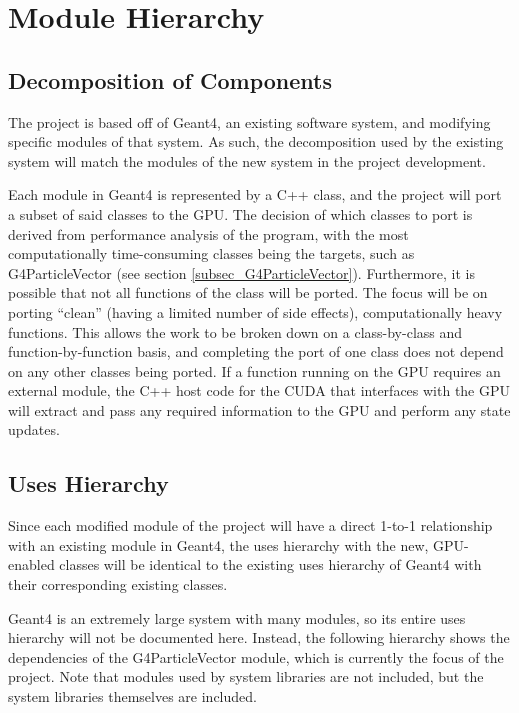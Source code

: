 \documentclass[12pt]{article}
\begin{document}
\section{Module Hierarchy}%
\subsection{Decomposition of Components}
The project is based off of Geant4, an existing software system, and modifying specific modules of that system. As such, the decomposition used by the existing system will match the modules of the new system in the project development.

Each module in Geant4 is represented by a C++ class, and the project will port a subset of said classes to the GPU. The decision of which classes to port is derived from performance analysis of the program, with the most computationally time-consuming classes being the targets, such as G4ParticleVector (see section \ref{subsec_G4ParticleVector}). Furthermore, it is possible that not all functions of the class will be ported. The focus will be on porting ``clean'' (having a limited number of side effects), computationally heavy functions. This allows the work to be broken down on a class-by-class and function-by-function basis, and completing the port of one class does not depend on any other classes being ported. If a function running on the GPU requires an external module, the C++ host code for the CUDA that interfaces with the GPU will extract and pass any required information to the GPU and perform any state updates.

\subsection{Uses Hierarchy}
Since each modified module of the project will have a direct 1-to-1 relationship with an existing module in Geant4, the uses hierarchy with the new, GPU-enabled classes will be identical to the existing uses hierarchy of Geant4 with their corresponding existing classes.

Geant4 is an extremely large system with many modules, so its entire uses hierarchy will not be documented here. Instead, the following hierarchy shows the dependencies of the G4ParticleVector module, which is currently the focus of the project. Note that modules used by system libraries are not included, but the system libraries themselves are included.
\end{document}
